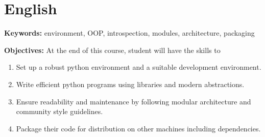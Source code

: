 \documentclass[11pt, a4paper]{article}
\begin{document}
\section*{English}
\noindent\textbf{Keywords:} environment, OOP, introspection, modules, architecture, packaging


\noindent\textbf{Objectives:}
At the end of this course, student will have the skills to
\begin{enumerate}
  \item Set up a robust python environment and a suitable development environment.
  \item Write efficient python programs using libraries and modern abstractions.
  \item Ensure readability and maintenance by following modular architecture and community style guidelines.
  \item Package their code for distribution on other machines including dependencies.
\end{enumerate}
\end{document}
